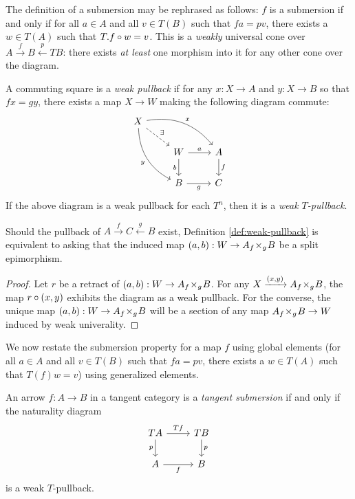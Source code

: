 The definition of a submersion may be rephrased as follows: $f$ is a submersion if and only if for all $a\in A$ and all $v\in T(B)$ such that $fa = pv$, there exists a $w\in T(A)$ such that $T.f \circ w = v$.
This is a \textit{weakly} universal cone over $A \xrightarrow{f} B \xleftarrow{p} TB$: there exists \textit{at least} one morphism into it for any other cone over the diagram. 
\begin{definition}\label{def:weak-pullback}
    A commuting square is a \textit{weak pullback} if for any $x:X \to A$ and $y:X \to B$ so that $fx = gy$, there exists a map $X \to W$ making the following diagram commute:
    \[
        \begin{tikzcd}
        X \ar[bend left]{rrd}{x} \ar[bend right]{ddr}[swap]{y} \ar[dashed]{rd}{\exists} \\
            & W \rar{a} \dar[swap]{b} & A \dar{f} \\
            & B \rar[swap]{g} & C
        \end{tikzcd}
    \]
    If the above diagram is a weak pullback for each $T^n$, then it is a \emph{weak $T$-pullback}.
\end{definition}
\begin{lemma}\label{lem:pb-retract}
    Should the pullback of $A \xrightarrow{f} C \xleftarrow{g} B$ exist, Definition \ref{def:weak-pullback} is equivalent to asking that the induced map $(a, b):W \to A {_{f}}\!\times_{g}\! B$ be a split epimorphism.
\end{lemma}
\begin{proof}
    Let $r$ be a retract of $(a,b):W \to A{_{f}}\!\times_{g}\! B$. For any $X \xrightarrow[]{(x,y)}  A{_{f}}\!\times_{g}\! B$, the map $ r \circ (x,y)$ exhibits the diagram as a weak pullback. For the converse, the unique map $(a,b):W \to A {_{f}}\!\times_{g}\! B$ will be a section of any map $A {_{f}}\!\times_{g}\! B \to W$ induced by weak univerality.
\end{proof}
We now restate the submersion property for a map $f$ using global elements (for all $a\in A$ and all $v\in T(B)$ such that $fa = pv$, there exists a $w\in T(A)$ such that $T(f)w = v$) using generalized elements.
\begin{definition}\label{def:tangent-submersion}
    An arrow $f:A \rightarrow B$ in a tangent category is a \emph{tangent submersion} if and only if the naturality diagram
    \[
        \begin{tikzcd}
            TA \rar{Tf} \dar[swap]{p} & TB \dar{p} \\
            A \rar[swap]{f} & B
        \end{tikzcd}
    \] 
    is a weak $T$-pullback. 
\end{definition}{}
